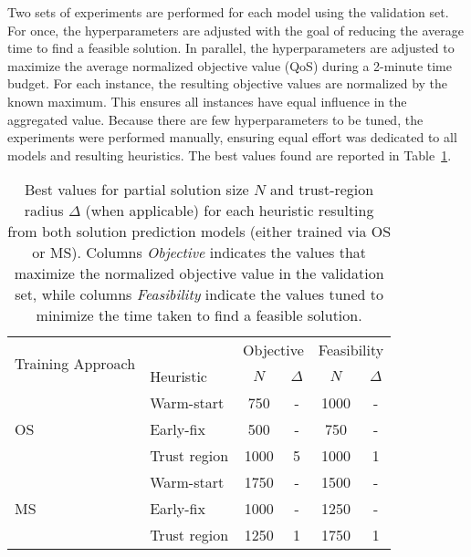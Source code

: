 Two sets of experiments are performed for each model using the validation set.
For once, the hyperparameters are adjusted with the goal of reducing the average time to find a feasible solution.
In parallel, the hyperparameters are adjusted to maximize the average normalized objective value (QoS) during a 2-minute time budget.
For each instance, the resulting objective values are normalized by the known maximum.
This ensures all instances have equal influence in the aggregated value.
Because there are few hyperparameters to be tuned, the experiments were performed manually, ensuring equal effort was dedicated to all models and resulting heuristics.
The best values found are reported in Table~\ref{tab:best-N-delta}.

\begin{table}[h]
    \centering
    \caption{%
	Best values for partial solution size $N$ and trust-region radius $\Delta$ (when applicable) for each heuristic resulting from both solution prediction models (either trained via OS or MS).
	Columns \emph{Objective} indicates the values that maximize the normalized objective value in the validation set, while columns \emph{Feasibility} indicate the values tuned to minimize the time taken to find a feasible solution.
 }
    \label{tab:best-N-delta}
    \begin{tabular}{ll|cc|cc}
    \toprule
    \multirow{2}{2cm}{Training Approach} & & \multicolumn{2}{c|}{Objective} & \multicolumn{2}{c}{Feasibility} \\
                            & Heuristic    & $N$         & $\Delta$        & $N$          & $\Delta$         \\
    \midrule
    \multirow{3}{*}{OS}      & Warm-start   & 750         & -               & 1000         & -                \\
                                        & Early-fix    & 500         & -               & 750          & -                \\
                                        & Trust region & 1000        & 5               & 1000         & 1                \\
    \midrule
    \multirow{3}{*}{MS} & Warm-start   & 1750        & -               & 1500         & -                \\
                                        & Early-fix    & 1000        & -               & 1250         & -                \\
                                        & Trust region & 1250        & 1               & 1750         & 1             \\
    \bottomrule 
    \end{tabular}
\end{table}

